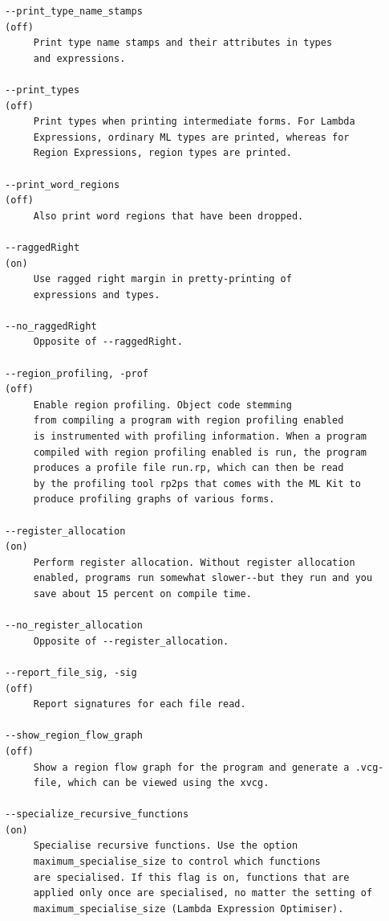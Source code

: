 \documentclass[12pt]{book}
\begin{document}
{\begin{verbatim}
--print_type_name_stamps                                            (off)
     Print type name stamps and their attributes in types
     and expressions.

--print_types                                                       (off)
     Print types when printing intermediate forms. For Lambda
     Expressions, ordinary ML types are printed, whereas for
     Region Expressions, region types are printed.

--print_word_regions                                                (off)
     Also print word regions that have been dropped.

--raggedRight                                                        (on)
     Use ragged right margin in pretty-printing of
     expressions and types.

--no_raggedRight
     Opposite of --raggedRight.

--region_profiling, -prof                                           (off)
     Enable region profiling. Object code stemming
     from compiling a program with region profiling enabled
     is instrumented with profiling information. When a program
     compiled with region profiling enabled is run, the program
     produces a profile file run.rp, which can then be read
     by the profiling tool rp2ps that comes with the ML Kit to
     produce profiling graphs of various forms.

--register_allocation                                                (on)
     Perform register allocation. Without register allocation
     enabled, programs run somewhat slower--but they run and you
     save about 15 percent on compile time.

--no_register_allocation
     Opposite of --register_allocation.

--report_file_sig, -sig                                             (off)
     Report signatures for each file read.

--show_region_flow_graph                                            (off)
     Show a region flow graph for the program and generate a .vcg-
     file, which can be viewed using the xvcg.

--specialize_recursive_functions                                     (on)
     Specialise recursive functions. Use the option
     maximum_specialise_size to control which functions
     are specialised. If this flag is on, functions that are
     applied only once are specialised, no matter the setting of
     maximum_specialise_size (Lambda Expression Optimiser).


\end{verbatim}}
\end{document}
